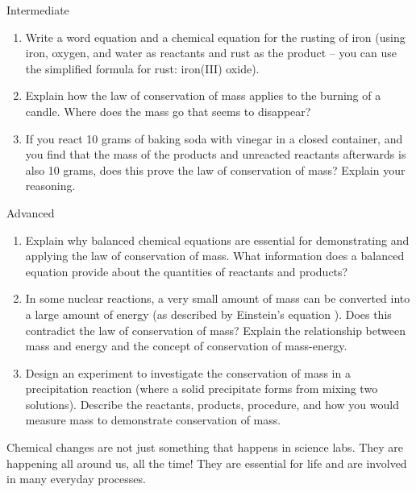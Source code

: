 \begin{tieredquestions}{Intermediate}
\begin{enumerate}
    \item  Write a word equation and a chemical equation for the rusting of iron (using iron, oxygen, and water as reactants and rust as the product – you can use the simplified formula for rust: iron(III) oxide).
    \item  Explain how the law of conservation of mass applies to the burning of a candle. Where does the mass go that seems to disappear?
    \item  If you react 10 grams of baking soda with vinegar in a closed container, and you find that the mass of the products and unreacted reactants afterwards is also 10 grams, does this prove the law of conservation of mass? Explain your reasoning.
\end{enumerate}
\end{tieredquestions}

\begin{tieredquestions}{Advanced}
\begin{enumerate}
    \item  Explain why balanced chemical equations are essential for demonstrating and applying the law of conservation of mass. What information does a balanced equation provide about the quantities of reactants and products? 
    \item  In some nuclear reactions, a very small amount of mass can be converted into a large amount of energy (as described by Einstein's equation ). Does this contradict the law of conservation of mass? Explain the relationship between mass and energy and the concept of conservation of mass-energy. 
    \item  Design an experiment to investigate the conservation of mass in a precipitation reaction (where a solid precipitate forms from mixing two solutions). Describe the reactants, products, procedure, and how you would measure mass to demonstrate conservation of mass.
\end{enumerate}
\end{tieredquestions}


\FloatBarrier
\1

Chemical changes are not just something that happens in science labs. They are happening all around us, all the time!  They are essential for life and are involved in many everyday processes.

